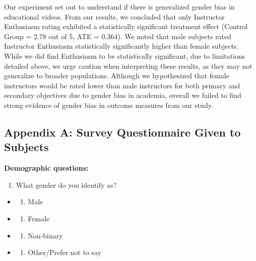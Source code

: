 \documentclass[
]{article}
\providecommand{\tightlist}{%
  \setlength{\itemsep}{0pt}\setlength{\parskip}{0pt}}
\begin{document}
Our experiment set out to understand if there is generalized gender bias
in educational videos. From our results, we concluded that only
Instructor Enthusiasm rating exhibited a statistically significant
treatment effect (Control Group = 2.78 out of 5, ATE = 0.364). We noted
that male subjects rated Instructor Enthusiasm statistically
significantly higher than female subjects. While we did find Enthusiasm
to be statistically significant, due to limitations detailed above, we
urge caution when interpreting these results, as they may not generalize
to broader populations. Although we hypothesized that female instructors
would be rated lower than male instructors for both primary and
secondary objectives due to gender bias in academia, overall we failed
to find strong evidence of gender bias in outcome measures from our
study.

\clearpage

\hypertarget{appendix-a-survey-questionnaire-given-to-subjects}{%
\subsection{Appendix A: Survey Questionnaire Given to
Subjects}\label{appendix-a-survey-questionnaire-given-to-subjects}}

\textbf{Demographic questions:}

\begin{enumerate}
\def\labelenumi{\arabic{enumi}.}
\tightlist
\item
  What gender do you identify as?
\end{enumerate}

\begin{itemize}
\item
  \begin{enumerate}
  \def\labelenumi{\alph{enumi}.}
  \tightlist
  \item
    Male
  \end{enumerate}
\item
  \begin{enumerate}
  \def\labelenumi{\alph{enumi}.}
  \setcounter{enumi}{1}
  \tightlist
  \item
    Female
  \end{enumerate}
\item
  \begin{enumerate}
  \def\labelenumi{\alph{enumi}.}
  \setcounter{enumi}{2}
  \tightlist
  \item
    Non-binary
  \end{enumerate}
\item
  \begin{enumerate}
  \def\labelenumi{\alph{enumi}.}
  \setcounter{enumi}{3}
  \tightlist
  \item
    Other/Prefer not to say
  \end{enumerate}
\end{itemize}
\end{document}
